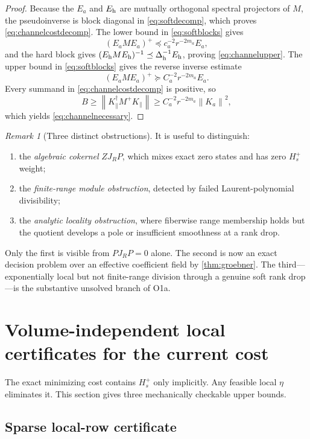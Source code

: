 \documentclass[11pt]{article}
\theoremstyle{definition}
\theoremstyle{remark}
\newtheorem{remark}[theorem]{Remark}
\newcommand{\norm}[1]{\left\lVert #1\right\rVert}
\begin{document}
\begin{proof}
Because the $E_a$ and $E_{\rm h}$ are mutually orthogonal spectral projectors of $M$, the pseudoinverse is block diagonal in \eqref{eq:softdecomp}, which proves \eqref{eq:channelcostdecomp}.  The lower bound in \eqref{eq:softblocks} gives
\[
 (E_aME_a)^+\preceq c_a^{-2}r^{-2m_a}E_a,
\]
and the hard block gives $(E_{\rm h}ME_{\rm h})^{-1}\preceq\Delta_{\rm h}^{-1}E_{\rm h}$, proving \eqref{eq:channelupper}.  The upper bound in \eqref{eq:softblocks} gives the reverse inverse estimate
\[
 (E_aME_a)^+\succeq C_a^{-2}r^{-2m_a}E_a.
\]
Every summand in \eqref{eq:channelcostdecomp} is positive, so
\[
 B\ge
 \norm{K_\parallel^\dagger M^+K_\parallel}
 \ge C_a^{-2}r^{-2m_a}\norm{K_a}^2,
\]
which yields \eqref{eq:channelnecessary}.
\end{proof}

\begin{remark}[Three distinct obstructions]
It is useful to distinguish:
\begin{enumerate}
\item the \emph{algebraic cokernel} $ZJ_RP$, which mixes exact zero states and has zero $H_s^+$ weight;
\item the \emph{finite-range module obstruction}, detected by failed Laurent-polynomial divisibility;
\item the \emph{analytic locality obstruction}, where fiberwise range membership holds but the quotient develops a pole or insufficient smoothness at a rank drop.
\end{enumerate}
Only the first is visible from $PJ_RP=0$ alone.  The second is now an exact decision problem over an effective coefficient field by \cref{thm:groebner}.  The third---exponentially local but not finite-range division through a genuine soft rank drop---is the substantive unsolved branch of O1a.
\end{remark}

\section{Volume-independent local certificates for the current cost}

The exact minimizing cost contains $H_s^+$ only implicitly.  Any feasible local $\eta$ eliminates it.  This section gives three mechanically checkable upper bounds.

\subsection{Sparse local-row certificate}
\end{document}
